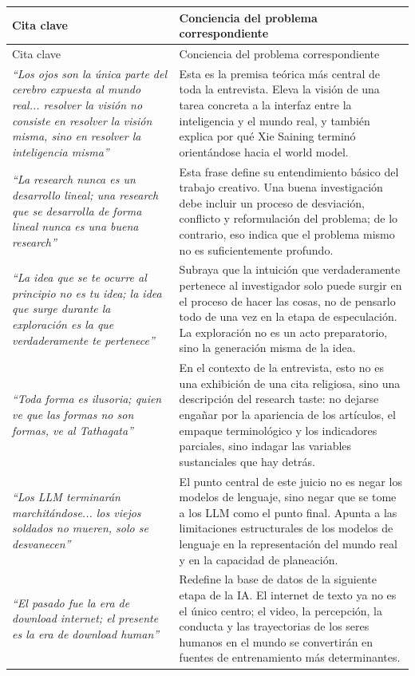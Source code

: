 \documentclass[a4paper,12pt]{article}
\begin{document}
\begin{longtable}{>{\raggedright\arraybackslash}p{} >{\raggedright\arraybackslash}p{}}
\toprule
Cita clave & Conciencia del problema correspondiente \\
\midrule
\endfirsthead
\toprule
Cita clave & Conciencia del problema correspondiente \\
\midrule
\endhead
\textit{``Los ojos son la única parte del cerebro expuesta al mundo real... resolver la visión no consiste en resolver la visión misma, sino en resolver la inteligencia misma''} & Esta es la premisa teórica más central de toda la entrevista. Eleva la visión de una tarea concreta a la interfaz entre la inteligencia y el mundo real, y también explica por qué Xie Saining terminó orientándose hacia el world model. \\
\textit{``La research nunca es un desarrollo lineal; una research que se desarrolla de forma lineal nunca es una buena research''} & Esta frase define su entendimiento básico del trabajo creativo. Una buena investigación debe incluir un proceso de desviación, conflicto y reformulación del problema; de lo contrario, eso indica que el problema mismo no es suficientemente profundo. \\
\textit{``La idea que se te ocurre al principio no es tu idea; la idea que surge durante la exploración es la que verdaderamente te pertenece''} & Subraya que la intuición que verdaderamente pertenece al investigador solo puede surgir en el proceso de hacer las cosas, no de pensarlo todo de una vez en la etapa de especulación. La exploración no es un acto preparatorio, sino la generación misma de la idea. \\
\textit{``Toda forma es ilusoria; quien ve que las formas no son formas, ve al Tathagata''} & En el contexto de la entrevista, esto no es una exhibición de una cita religiosa, sino una descripción del research taste: no dejarse engañar por la apariencia de los artículos, el empaque terminológico y los indicadores parciales, sino indagar las variables sustanciales que hay detrás. \\
\textit{``Los LLM terminarán marchitándose... los viejos soldados no mueren, solo se desvanecen''} & El punto central de este juicio no es negar los modelos de lenguaje, sino negar que se tome a los LLM como el punto final. Apunta a las limitaciones estructurales de los modelos de lenguaje en la representación del mundo real y en la capacidad de planeación. \\
\textit{``El pasado fue la era de download internet; el presente es la era de download human''} & Redefine la base de datos de la siguiente etapa de la IA. El internet de texto ya no es el único centro; el video, la percepción, la conducta y las trayectorias de los seres humanos en el mundo se convertirán en fuentes de entrenamiento más determinantes. \\

\end{longtable}
\end{document}
